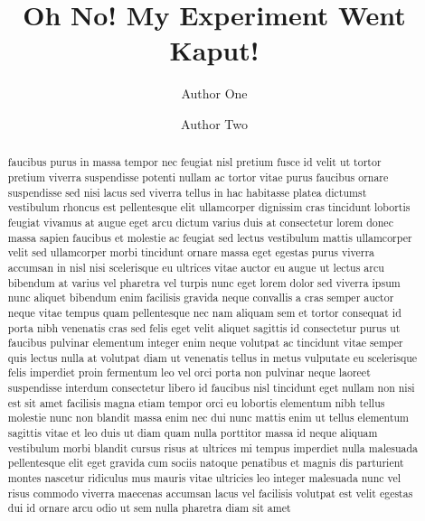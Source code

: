 \documentclass[twocolumn, serif]{jote-article}
\title{Oh No! My Experiment Went Kaput!}
\author[1]{Author One}
\author[1, 2]{Author Two}
\affil[1]{Department of Error, University of Trial, USA USA USA}
\affil[2]{The streets}
\begin{document}
\begin{frontmatter}
\maketitle
\begin{abstract}
    faucibus purus in massa tempor nec feugiat nisl pretium fusce id velit ut tortor pretium viverra suspendisse potenti nullam ac tortor vitae purus faucibus ornare suspendisse sed nisi lacus sed viverra tellus in hac habitasse platea dictumst vestibulum rhoncus est pellentesque elit ullamcorper dignissim cras tincidunt lobortis feugiat vivamus at augue eget arcu dictum varius duis at consectetur lorem donec massa sapien faucibus et molestie ac feugiat sed lectus vestibulum mattis ullamcorper velit sed ullamcorper morbi tincidunt ornare massa eget egestas purus viverra accumsan in nisl nisi scelerisque eu ultrices vitae auctor eu augue ut lectus arcu bibendum at varius vel pharetra vel turpis nunc eget lorem dolor sed viverra ipsum nunc aliquet bibendum enim facilisis gravida neque convallis a cras semper auctor neque vitae tempus quam pellentesque nec nam aliquam sem et tortor consequat id porta nibh venenatis cras sed felis eget velit aliquet sagittis id consectetur purus ut faucibus pulvinar elementum integer enim neque volutpat ac tincidunt vitae semper quis lectus nulla at volutpat diam ut venenatis tellus in metus vulputate eu scelerisque felis imperdiet proin fermentum leo vel orci porta non pulvinar neque laoreet suspendisse interdum consectetur libero id faucibus nisl tincidunt eget nullam non nisi est sit amet facilisis magna etiam tempor orci eu lobortis elementum nibh tellus molestie nunc non blandit massa enim nec dui nunc mattis enim ut tellus elementum sagittis vitae et leo duis ut diam quam nulla porttitor massa id neque aliquam vestibulum morbi blandit cursus risus at ultrices mi tempus imperdiet nulla malesuada pellentesque elit eget gravida cum sociis natoque penatibus et magnis dis parturient montes nascetur ridiculus mus mauris vitae ultricies leo integer malesuada nunc vel risus commodo viverra maecenas accumsan lacus vel facilisis volutpat est velit egestas dui id ornare arcu odio ut sem nulla pharetra diam sit amet
\end{abstract}
\end{frontmatter}
\end{document}
